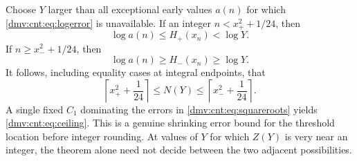 \documentclass[11pt,letterpaper]{article}
\numberwithin{equation}{section}
\theoremstyle{definition}\newtheorem{definition}[theorem]{Definition}
\theoremstyle{remark}\newtheorem{remark}[theorem]{Remark}
\begin{document}
Choose $Y$ larger than all exceptional early values $a(n)$ for which \eqref{dmv:cnt:eq:logerror} is unavailable. If an integer $n<x_+^2+1/24$, then
\[
\log a(n)\le H_+(x_n)<\log Y.
\]
If $n\ge x_-^2+1/24$, then
\[
\log a(n)\ge H_-(x_n)\ge\log Y.
\]
It follows, including equality cases at integral endpoints, that
\begin{equation}\label{dmv:cnt:eq:root-ceilings}
\left\lceil x_+^2+\frac1{24}\right\rceil
\le N(Y)\le
\left\lceil x_-^2+\frac1{24}\right\rceil.
\end{equation}
A single fixed $C_1$ dominating the errors in \eqref{dmv:cnt:eq:squareroots} yields \eqref{dmv:cnt:eq:ceiling}. This is a genuine shrinking error bound for the threshold location before integer rounding. At values of $Y$ for which $Z(Y)$ is very near an integer, the theorem alone need not decide between the two adjacent possibilities.
\end{document}
